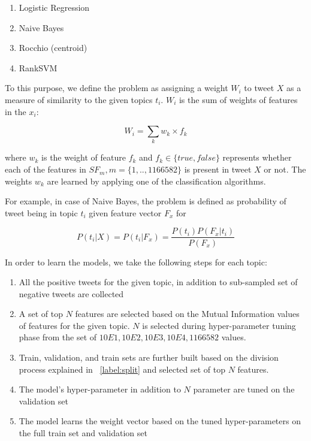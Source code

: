 \begin{enumerate}
\item Logistic Regression
\item Naive Bayes
\item Rocchio (centroid)
\item RankSVM
\end{enumerate}

To this purpose, we define the problem as assigning a weight ${W_{i}}$ to tweet ${X}$ as a measure of similarity to the given topics ${t_{i}}$. ${W_{i}}$ is the sum of weights of  features in the ${x_{i}}$:

\begin{equation}
W_{i} = \sum_{k} w_{k}\times f_{k}
\end{equation}

where ${w_{k}}$ is the weight of feature ${f_{k}}$ and ${f_{k} \in \{true, false\}}$ represents whether each of the features in ${SF_{m}},m = \{ 1,..,1166582 \} $ is present in tweet ${X}$ or not. The weights ${w_{k}}$ are learned by applying one of the classification algorithms.

For example, in case of Naive Bayes, the problem is defined as probability of tweet being in topic ${t_{i}}$ given feature vector ${F_{x}}$ for 

\begin{equation}
P({t_{i}}|X) = P({t_{i}}|{F_{x}}) = \frac {P({t_{i}})P({F_{x}}|{t_{i}})}{P({F_{x}})}
\end{equation}

In order to learn the models, we take the following steps for each topic:
\begin{enumerate}
\item All the positive tweets for the given topic, in addition to sub-sampled set of negative tweets are collected
\item A set of top $N$ features are selected based on the Mutual Information values of features for the given topic. $N$ is selected during hyper-parameter tuning phase from the set of ${10E1, 10E2, 10E3, 10E4, 1166582}$ values.
\item Train, validation, and train sets are further built based on the division process explained in ~\ref{label:split} and selected set of top $N$ features.
\item The model's hyper-parameter in addition to $N$ parameter are tuned on the validation set
\item The model learns the weight vector based on the tuned hyper-parameters on the full train set and validation set
\end{enumerate}

